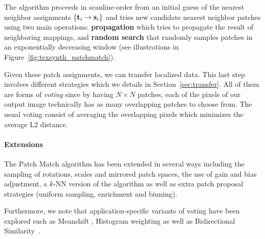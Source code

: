 The algorithm proceeds in scanline-order from an initial guess of the nearest neighbor assignments $\{\mathbf{t}_i \to \mathbf{s}_i\}$ and tries new candidate nearest neighbor patches using two main operations:
\textbf{propagation} which tries to propagate the result of neighboring mappings, and 
\textbf{random search} that randomly samples patches in an exponentially decreasing window (see illustrations in Figure~\ref{fig:texsynth_patchmatch}).

Given these patch assignments, we can transfer localized data.
This last step involves different strategies which we details in Section~\ref{sec:transfer}. 
All of them are forms of \emph{voting} since by having $N\times N$ patches, each of the pixels of our output image technically has as many overlapping patches to choose from.
The usual voting consist of averaging the overlapping pixels which minimizes the average L2 distance.

\paragraph{Extensions}
The Patch Match algorithm has been extended in several ways \cite{Barnes10} including the sampling of rotations, scales and mirrored patch spaces, the use of gain and bias adjustment, a $k$-NN version of the algorithm as well as extra patch proposal strategies (uniform sampling, enrichment and binning).

Furthermore, we note that application-specific variants of voting have been explored such as Meanshift \cite{Wexler07}, Histogram weighting \cite{Kopf07} as well as Bidirectional Similarity~\cite{Simakov08}.